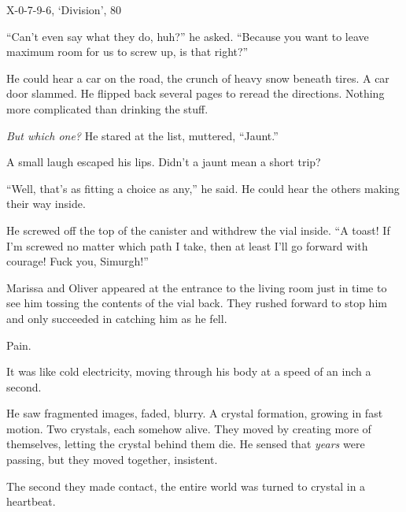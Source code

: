  X-0-7-9-6, `Division', 80%



``Can't even say what they do, huh?'' he asked.  ``Because you want to leave maximum room for us to screw up, is that right?''



He could hear a car on the road, the crunch of heavy snow beneath tires.  A car door slammed.  He flipped back several pages to reread the directions.  Nothing more complicated than drinking the stuff.



\emph{But which one?}  He stared at the list, muttered, ``Jaunt.''



A small laugh escaped his lips.  Didn't a jaunt mean a short trip?



``Well, that's as fitting a choice as any,'' he said.  He could hear the others making their way inside.



He screwed off the top of the canister and withdrew the vial inside.  ``A toast!  If I'm screwed no matter which path I take, then at least I'll go forward with courage!  Fuck you, Simurgh!''



Marissa and Oliver appeared at the entrance to the living room just in time to see him tossing the contents of the vial back.  They rushed forward to stop him and only succeeded in catching him as he fell.



Pain.



It was like cold electricity, moving through his body at a speed of an inch a second.



He saw fragmented images, faded, blurry.  A crystal formation, growing in fast motion.  Two crystals, each somehow alive.  They moved by creating more of themselves, letting the crystal behind them die.  He sensed that \emph{years} were passing, but they moved together, insistent.



The second they made contact, the entire world was turned to crystal in a heartbeat.



